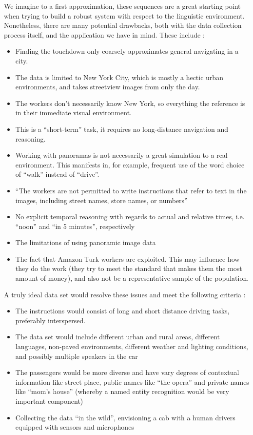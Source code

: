 \documentclass[a4paper, 11pt]{article}
\begin{document}
We imagine to a first approximation, these sequences are a great starting point
when trying to build a robust system with respect to the linguistic environment.
Nonetheless, there are many potential drawbacks, both with the data collection
process itself, and the application we have in mind. These include :

\begin{itemize}
\item Finding the touchdown only coarsely approximates general navigating in a city.
\item The data is limited to New York City, which is mostly a hectic urban environments,
  and takes streetview images from only the day.
\item The workers don't necessarily know New York, so everything the reference is in their immediate
  visual environment.
\item This is a ``short-term'' task, it requires no long-distance navigation
  and reasoning. 
\item Working with panoramas is not necessarily a great simulation to a real
  environment. This manifests in, for example, frequent use of the word choice
  of ``walk'' instead of ``drive''.
\item ``The workers are not permitted to write instructions that refer to text in the
images, including street names, store names, or numbers''  \cite{chen2019touchdown}
\item No explicit temporal reasoning with regards to actual and relative times,
  i.e. ``noon'' and ``in 5 minutes'', respectively
\item The limitations of using panoramic image data
\item The fact that Amazon Turk workers are exploited. This may influence how they
  do the work (they try to meet the standard that makes them the most amount of
  money), and also not be a representative sample of the population.
\end{itemize}

A truly ideal data set would resolve these issues and meet the following
criteria :

\begin{itemize}
\item The instructions would consist of long and short distance driving tasks,
  preferably interspersed.
\item The data set would include different urban and rural areas, different
  languages, non-paved environments, different weather and lighting conditions, and possibly multiple speakers in the car
\item The passengers would be more diverse and have vary degrees of contextual
  information like street place, public names like ``the opera'' and 
  private names like ``mom's house'' (whereby a named entity recognition would
  be very important component)
\item Collecting the data ``in the wild'', envisioning a cab with a human
  drivers equipped with sensors and microphones
\end{itemize}
\end{document}
